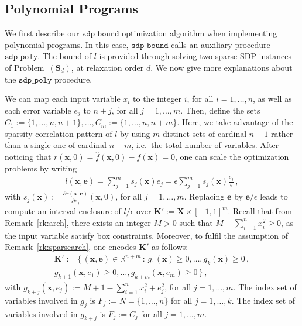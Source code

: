 \documentclass[preprint]{sigplanconf}
\newcommand{\R}{\mathbb{R}}
\newcommand{\x}{\mathbf{x}}
\newcommand{\e}{\mathbf{e}}
\def\S{\mathbf{S}}
\def\K{\mathbf{K}}
\def\S{\mathbf{S}}
\def\X{\mathbf{X}}
\newcommand{\sdpbound}{\mathtt{sdp\_bound}}
\newcommand{\sdppoly}{\mathtt{sdp\_poly}}
\theoremstyle{plain}
\begin{document}
\subsection{Polynomial Programs}
\label{sec:polsdp}
%
We first describe our $\sdpbound$ optimization algorithm when implementing polynomial programs. In this case, $\sdpbound$ calls an auxiliary procedure $\sdppoly$.
The bound of $l$ is provided through solving two sparse SDP instances of Problem~$(\S_d)$, at relaxation order $d$. We now give more explanations about the $\sdppoly$ procedure.

We can map each input variable $x_i$ to the integer $i$, for all $i=1,\dots,n$, as well as each error variable $e_j$ to $n+j$, for all $j=1,\dots,m$. Then, define the sets $C_1 := \{1,\dots,n,n+1\}, \dots, C_m := \{1,\dots,n,n+m\}$. Here, we take advantage of the sparsity correlation pattern of $l$ by using $m$ distinct sets of cardinal $n+1$ rather than a single one of cardinal $n+m$, i.e.~the total number of variables. 
After noticing that $r(\x,0) = \hat{f}(\x,0) - f(\x) = 0$, one can scale the optimization problems by writing 
\begin{align}
\label{eq:lscale}
l(\x,\e) = \sum_{j=1}^m s_j (\x) e_j = \epsilon \sum_{j=1}^m s_j (\x) \frac{e_j}{\epsilon} \,,
\end{align}
%
with $s_j(\x) := \frac{\partial r(\x,\e)} {\partial e_j} (\x,0)$, for all $j=1,\dots,m$. Replacing $\e$ by $\e/\epsilon$ leads to compute an interval enclosure of $l/\epsilon$ over $\K' := \X \times [-1, 1]^m$.
Recall that from Remark~\ref{rk:arch}, there exists an integer $M > 0$ such that $M - \sum_{i=1}^n x_i^2 \geq 0$, as the input variable satisfy box constraints.
Moreover, to fulfil the assumption of Remark~\ref{rk:sparsearch},  one encodes $\K'$ as follows: 
\begin{align*}
\K' := \{\, (\x,\e) \in \R^{n+m} \, : \, g_1 (\x) \geq 0, \dots, g_k(\x) \geq 0 \,, \\
g_{k+1}(\x,e_1) \geq 0, \dots, g_{k+m} (\x, e_m) \geq 0 \,\} \,,
\end{align*}
%
with $g_{k+j}(\x, e_j) := M + 1 -  \sum_{i=1}^n x_i^2 + e_j^2$, for all $j=1,\dots, m$. 
The index set of variables involved in $g_j$ is $F_j := N = \{1, \dots, n\}$ for all $j=1, \dots, k$. 
The index set of variables involved in $g_{k+j}$ is $F_j := C_j$ for all $j=1, \dots, m$. 
\end{document}
